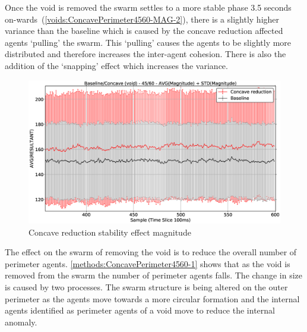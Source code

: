 Once the void is removed the swarm settles to a more stable phase 3.5 seconds on-wards~(\autoref{voids:ConcavePerimeter4560-MAG-2}), there is a slightly higher variance than the baseline which is caused by the concave reduction affected agents `pulling' the swarm. This `pulling' causes the agents to be slightly more distributed and therefore increases the inter-agent cohesion. There is also the addition of the `snapping' effect which increases the variance. 
\begin{figure}[H]
\begin{center}
\includegraphics[width=15cm]{CHAPTER-7/figures/ConcavePerimeter4560-MAG-2}
\end{center}
\caption{Concave reduction stability effect magnitude\label{voids:ConcavePerimeter4560-MAG-2}}
\end{figure}

The effect on the swarm of removing the void is to reduce the overall number of perimeter agents. \autoref{methods:ConcavePerimeter4560-1} shows that as the void is removed from the swarm the number of perimeter agents falls. The change in size is caused by two processes. The swarm structure is being altered on the outer perimeter as the agents move towards a more circular formation and the internal agents identified as perimeter agents of a void move to reduce the internal anomaly. 


